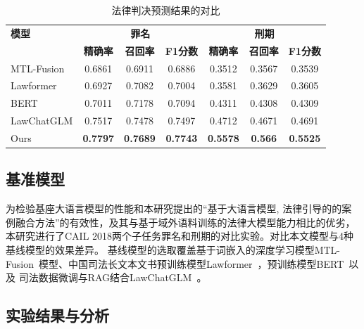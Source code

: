 \begin{table}[htbp]
	\centering
	\caption{ 法律判决预测结果的对比}
	\begin{tabular}{lcccccc}
		\toprule
		\textbf{模型} & \multicolumn{3}{c}{\textbf{罪名}} & \multicolumn{3}{c}{\textbf{刑期}}                                                               \\
		\cmidrule(lr){2-4} \cmidrule(lr){5-7}
		            & \textbf{精确率}                    & \textbf{召回率}                    & \textbf{F1分数} & \textbf{精确率} & \textbf{召回率} & \textbf{F1分数} \\
		\midrule
		MTL-Fusion  & 0.6861                          & 0.6911                          & 0.6886        & 0.3512       & 0.3567       & 0.3539        \\
		Lawformer   & 0.6927                          & 0.7082                          & 0.7004        & 0.3581       & 0.3629       & 0.3605        \\
		BERT        & 0.7011                          & 0.7178                          & 0.7094        & 0.4311       & 0.4308       & 0.4309        \\
		LawChatGLM  & 0.7517                          & 0.7478                          & 0.7497        & 0.4712       & 0.4671       & 0.4691        \\
		Ours        & \textbf{0.7797}                          & \textbf{0.7689}                          & \textbf{0.7743}        & \textbf{0.5578}       & \textbf{0.566}        & \textbf{0.5525}        \\
		\bottomrule
	\end{tabular}
	\label{tab:performance_comparison}
\end{table}

\subsection{\heiti 基准模型}
为检验基座大语言模型的性能和本研究提出的“基于大语言模型, 法律引导的的案例融合方法”的有效性，及其与基于域外语料训练的法律大模型能力相比的优劣，本研究进行了CAIL 2018两个子任务罪名和刑期的对比实验。对比本文模型与4种基线模型的效果差异。
基线模型的选取覆盖基于词嵌入的深度学习模型MTL-Fusion~\cite{zhuopeng-etal-2020-multi}模型、中国司法长文本文书预训练模型Lawformer~\cite{xiao2021lawformer}，预训练模型BERT~\cite{fan2022multi}以及 司法数据微调与RAG结合LawChatGLM~\cite{JSJA202505027}。

\subsection{\heiti 实验结果与分析}


